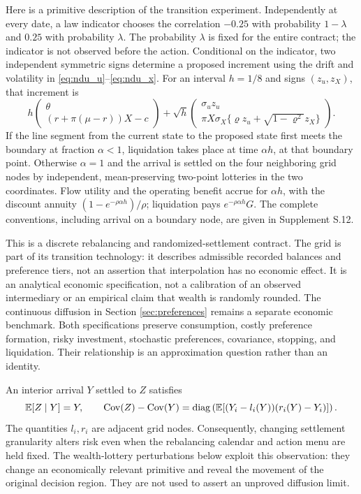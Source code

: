 Here is a primitive description of the transition experiment. Independently at every date, a law indicator chooses the correlation $-0.25$ with probability $1-\lambda$ and $0.25$ with probability $\lambda$. The probability $\lambda$ is fixed for the entire contract; the indicator is not observed before the action. Conditional on the indicator, two independent symmetric signs determine a proposed increment using the drift and volatility in \eqref{eq:ndu_u}--\eqref{eq:ndu_x}. For an interval $h=1/8$ and signs $(z_u,z_X)$, that increment is
\begin{equation}
 h\begin{pmatrix}\theta\\(r+\pi(\mu-r))X-c\end{pmatrix}
 +\sqrt h\begin{pmatrix}\sigma_u z_u\\
 \pi X\sigma_X\{\varrho z_u+\sqrt{1-\varrho^2}z_X\}\end{pmatrix}.
 \label{eq:r8_increment}
\end{equation}
If the line segment from the current state to the proposed state first meets the boundary at fraction $\alpha<1$, liquidation takes place at time $\alpha h$, at that boundary point. Otherwise $\alpha=1$ and the arrival is settled on the four neighboring grid nodes by independent, mean-preserving two-point lotteries in the two coordinates. Flow utility and the operating benefit accrue for $\alpha h$, with the discount annuity $(1-e^{-\rho\alpha h})/\rho$; liquidation pays $e^{-\rho\alpha h}G$. The complete conventions, including arrival on a boundary node, are given in Supplement S.12.

This is a discrete rebalancing and randomized-settlement contract. The grid is part of its transition technology: it describes admissible recorded balances and preference tiers, not an assertion that interpolation has no economic effect. It is an analytical economic specification, not a calibration of an observed intermediary or an empirical claim that wealth is randomly rounded. The continuous diffusion in Section \ref{sec:preferences} remains a separate economic benchmark. Both specifications preserve consumption, costly preference formation, risky investment, stochastic preferences, covariance, stopping, and liquidation. Their relationship is an approximation question rather than an identity.

An interior arrival $Y$ settled to $Z$ satisfies
\begin{equation}
 \mathbb E[Z\mid Y]=Y,\qquad
 \operatorname{Cov}(Z)-\operatorname{Cov}(Y)
 =\operatorname{diag}\left(\mathbb E[(Y_i-l_i(Y))(r_i(Y)-Y_i)]\right).
 \label{eq:r8_rounding_variance}
\end{equation}
The quantities $l_i,r_i$ are adjacent grid nodes. Consequently, changing settlement granularity alters risk even when the rebalancing calendar and action menu are held fixed. The wealth-lottery perturbations below exploit this observation: they change an economically relevant primitive and reveal the movement of the original decision region. They are not used to assert an unproved diffusion limit.

